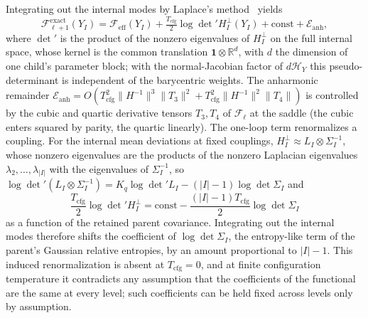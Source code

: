 Integrating out the internal modes by Laplace's method~\cite{wong2001asymptotic} yields
\begin{equation}
\mathcal{F}^{\mathrm{exact}}_{\ell+1}(Y_I) = \mathcal{F}_{\mathrm{eff}}(Y_I) + \tfrac{T_{\mathrm{cfg}}}{2}\log\det{}'H_I^\perp(Y_I) + \mathrm{const} + \mathcal{E}_{\mathrm{anh}},
\label{eq:rg_laplace}
\end{equation}
where $\det{}'$ is the product of the nonzero eigenvalues of $H_I^\perp$ on the full internal space, whose kernel is the common translation $\mathbf{1}\otimes\mathbb{R}^{d}$, with $d$ the dimension of one child's parameter block; with the normal-Jacobian factor of $d\mathcal{H}_Y$ this pseudo-determinant is independent of the barycentric weights. The anharmonic remainder $\mathcal{E}_{\mathrm{anh}} = O(T_{\mathrm{cfg}}^2 \|H^{-1}\|^3 \|T_3\|^2 + T_{\mathrm{cfg}}^2 \|H^{-1}\|^2 \|T_4\|)$ is controlled by the cubic and quartic derivative tensors $T_3, T_4$ of $\mathcal{F}_\ell$ at the saddle (the cubic enters squared by parity, the quartic linearly). The one-loop term renormalizes a coupling. For the internal mean deviations at fixed couplings, $H_I^\perp\approx L_I\otimes\Sigma_I^{-1}$, whose nonzero eigenvalues are the products of the nonzero Laplacian eigenvalues $\lambda_2,\ldots,\lambda_{|I|}$ with the eigenvalues of $\Sigma_I^{-1}$, so $\log\det{}'(L_I\otimes\Sigma_I^{-1})=K_q\log\det{}'L_I-(|I|-1)\log\det\Sigma_I$ and
\begin{equation}
\frac{T_{\mathrm{cfg}}}{2}\log\det{}'H_I^\perp=\mathrm{const}-\frac{(|I|-1)T_{\mathrm{cfg}}}{2}\log\det\Sigma_I
\label{eq:rg_entropy_shift}
\end{equation}
as a function of the retained parent covariance. Integrating out the internal modes therefore shifts the coefficient of $\log\det\Sigma_I$, the entropy-like term of the parent's Gaussian relative entropies, by an amount proportional to $|I|-1$. This induced renormalization is absent at $T_{\mathrm{cfg}}=0$, and at finite configuration temperature it contradicts any assumption that the coefficients of the functional are the same at every level; such coefficients can be held fixed across levels only by assumption.

